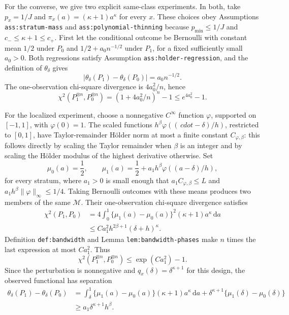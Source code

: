 For the converse, we give two explicit same-class experiments.  In both, take \(p_x=1/J\) and \(\pi_x(a)=(\kappa+1)a^\kappa\) for every \(x\).  These choices obey Assumptions \texttt{ass:stratum-mass} and \texttt{ass:polynomial-thinning} because \(p_{\min}\leq1/J\) and \(c_-\leq\kappa+1\leq c_+\).  First let the conditional outcome be Bernoulli with constant mean \(1/2\) under \(P_0\) and \(1/2+a_0n^{-1/2}\) under \(P_1\), for a fixed sufficiently small \(a_0>0\).  Both regressions satisfy Assumption \texttt{ass:holder-regression}, and the definition of \(\theta_\delta\) gives
\[
 |\theta_\delta(P_1)-\theta_\delta(P_0)|=a_0n^{-1/2}. \tag{18}
\]
The one-observation chi-square divergence is \(4a_0^2/n\), hence
\[
 \chi^2(P_1^{\otimes n},P_0^{\otimes n})
 =(1+4a_0^2/n)^n-1\leq e^{4a_0^2}-1. \tag{19}
\]

For the localized experiment, choose a nonnegative \(C^\infty\) function \(\varphi\), supported on \([-1,1]\), with \(\varphi(0)=1\).  The scaled functions \(h^\beta\varphi((\,cdot-\delta)/h)\), restricted to \([0,1]\), have Taylor-remainder Hölder norm at most a finite constant \(C_{\varphi,\beta}\): this follows directly by scaling the Taylor remainder when \(\beta\) is an integer and by scaling the Hölder modulus of the highest derivative otherwise.  Set
\[
 \mu_0(a)=\frac12,
 \qquad
 \mu_1(a)=\frac12+a_1h^\beta\varphi((a-\delta)/h), \tag{20}
\]
for every stratum, where \(a_1>0\) is small enough that \(a_1C_{\varphi,\beta}\leq L\) and \(a_1h^\beta\lVert\varphi\rVert_\infty\leq1/4\).  Taking Bernoulli outcomes with these means produces two members of the same \(\mathcal M\).  Their one-observation chi-square divergence satisfies
\[
 \begin{aligned}
 \chi^2(P_1,P_0)
 &=4\int_0^1\{\mu_1(a)-\mu_0(a)\}^2(\kappa+1)a^\kappa\,\mathrm da\\
 &\leq Ca_1^2h^{2\beta+1}(\delta+h)^\kappa.
 \end{aligned} \tag{21}
\]
Definition \texttt{def:bandwidth} and Lemma \texttt{lem:bandwidth-phases} make \(n\) times the last expression at most \(Ca_1^2\).  Thus
\[
 \chi^2(P_1^{\otimes n},P_0^{\otimes n})
 \leq \exp(Ca_1^2)-1. \tag{22}
\]
Since the perturbation is nonnegative and \(q_x(\delta)=\delta^{\kappa+1}\) for this design, the observed functional has separation
\[
 \begin{aligned}
 \theta_\delta(P_1)-\theta_\delta(P_0)
 &=\int_\delta^1\{\mu_1(a)-\mu_0(a)\}(\kappa+1)a^\kappa\,\mathrm da
   +\delta^{\kappa+1}\{\mu_1(\delta)-\mu_0(\delta)\}\\
 &\geq a_1\delta^{\kappa+1}h^\beta. 
 \end{aligned} \tag{23}
\]

